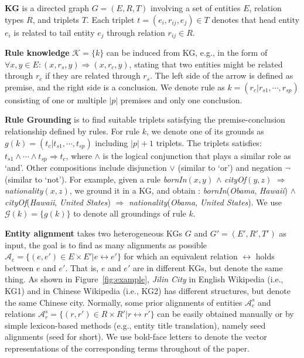 \documentclass[11pt,a4paper]{article}
\newcommand{\para}[1]{\vspace{0.01in}\noindent\textbf{#1 }}
\begin{document}
\para{KG} is a directed graph $G = (E, R, T)$ involving a set of entities $E$, relation types $R$, and triplets $T$. Each triplet $t=(e_i,r_{ij},e_j)\in T$ denotes that head entity $e_i$ is related to tail entity $e_j$ through relation $r_{ij}\in R$.

\para{Rule knowledge} $\mathcal{K}=\{k\}$ can be induced from KG, e.g., in the form of $\forall x,y\in E:(x,r_s,y)\Rightarrow (x,r_c,y)$, stating that two entities might be related through $r_c$ if they are related through $r_s$. The left side of the arrow is defined as premise, and the right side is a conclusion. We denote rule as $k=(r_c|r_{s1},\cdots,r_{sp})$ consisting of one or multiple $|p|$ premises and only one conclusion.

\para{Rule Grounding} is to find suitable triplets satisfying the premise-conclusion relationship defined by rules. For rule $k$, we denote one of its grounds as $g(k)=(t_c|t_{s1},\cdots,t_{sp})$ including $|p|+1$ triplets. The triplets satisfies: $t_{s1}\wedge\cdots \wedge t_{sp}\Rightarrow t_c$, where $\wedge$ is the logical conjunction that plays a similar role as `and'. Other compositions include disjunction $\vee$ (similar to `or') and negation $\neg$ (similar to `not'). For example, given a rule \textit{bornIn}$(x,y)$ $\wedge$ \textit{cityOf}$(y,z)$ $\Rightarrow$ \textit{nationality}$(x,z)$, we ground it in a KG, and obtain : \textit{bornIn}(\textit{Obama}, \textit{Hawaii}) $\wedge$ \textit{cityOf}(\textit{Hawaii}, \textit{United States}) $\Rightarrow$ \textit{nationality}(\textit{Obama}, \textit{United States}). We use $\mathcal{G}(k)=\{g(k)\}$ to denote all groundings of rule $k$.

\para{Entity alignment} takes two heterogeneous KGs $G$ and $G' = (E', R', T')$ as input, the goal is to find as many alignments as possible $\mathcal{A}_e = \{(e, e') \in E \times E'|e \leftrightarrow e'\}$ for which an equivalent relation $\leftrightarrow$ holds between $e$ and $e'$. That is, $e$ and $e'$ are in different KGs, but denote the same thing. As shown in Figure~\ref{fig:example}, \textit{Jilin City} in English Wikipedia (i.e., KG1) and in Chinese Wikipedia (i.e., KG2) has different structures, but denote the same Chinese city. Normally, some prior alignments of entities $\mathcal{A}_e^s$ and relations $\mathcal{A}_r^s = \{(r, r') \in R \times R'|r \leftrightarrow r'\}$ can be easily obtained manually or by simple lexicon-based methods (e.g., entity title translation), namely seed alignments (seed for short). We use bold-face letters to denote the vector representations of the corresponding terms throughout of the paper.
\end{document}
